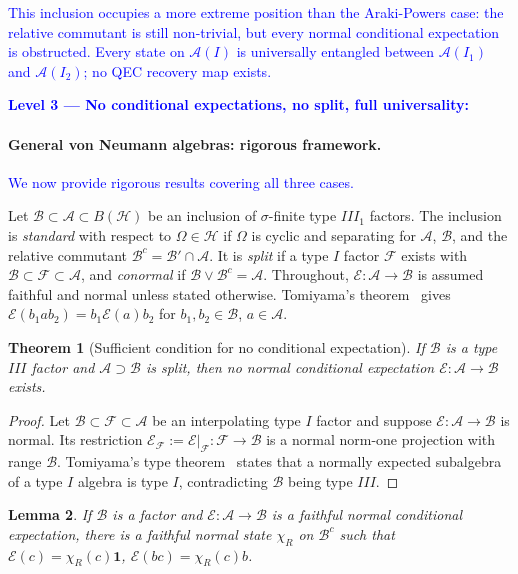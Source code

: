 \documentclass[a4paper,11pt]{article}
\newtheorem{theorem}{Theorem}
\newtheorem{lemma}[theorem]{Lemma}
\theoremstyle{definition}
\theoremstyle{remark}
\newcommand{\mA}{\mathcal{A}}
\newcommand{\mB}{\mathcal{B}}
\newcommand{\mE}{\mathcal{E}}
\begin{document}
\textcolor{blue}{This inclusion occupies a more extreme position than the Araki-Powers case: the
relative commutant is still non-trivial, but every normal conditional expectation is
obstructed.  Every state on $\mathcal{A}(I)$ is universally entangled between
$\mathcal{A}(I_1)$ and $\mathcal{A}(I_2)$; no QEC recovery map exists.}
 
\textcolor{blue}{\medskip
\noindent\textbf{Level 3 — No conditional expectations, no split, full universality:}}
 
\paragraph{General von Neumann algebras: rigorous framework.}%
\label{sec:conormality-expectations}
\textcolor{blue}{We now provide rigorous results covering all three cases.}
 
Let $\mB\subset\mA\subset B(\mathcal{H})$ be an inclusion of $\sigma$-finite type
$III_1$ factors.  The inclusion is \emph{standard} with respect to $\Omega\in\mathcal{H}$
if $\Omega$ is cyclic and separating for $\mA$, $\mB$, and the relative commutant
$\mB^c=\mB'\cap\mA$.  It is \emph{split} if a type $I$ factor $\mathcal{F}$ exists with
$\mB\subset\mathcal{F}\subset\mA$, and \emph{conormal} if $\mB\vee\mB^c=\mA$.
Throughout, $\mE:\mA\to\mB$ is assumed faithful and normal unless stated otherwise.
Tomiyama's theorem~\cite{Tomiyama1957,Tomiyama1959,Takesaki1972} gives
$\mE(b_1ab_2)=b_1\mE(a)b_2$ for $b_1,b_2\in\mB$, $a\in\mA$.
 
\begin{theorem}[Sufficient condition for no conditional expectation]%
\label{thm:split-no-expectation}
If $\mB$ is a type $III$ factor and $\mA\supset\mB$ is split, then no normal
conditional expectation $\mE:\mA\to\mB$ exists.
\end{theorem}
 
\begin{proof}
Let $\mB\subset\mathcal{F}\subset\mA$ be an interpolating type $I$ factor and suppose
$\mE:\mA\to\mB$ is normal.  Its restriction
$\mE_\mathcal{F}:=\mE|_\mathcal{F}:\mathcal{F}\to\mB$ is a normal norm-one projection
with range $\mB$.  Tomiyama's type theorem~\cite{Tomiyama1959,Takesaki1972} states
that a normally expected subalgebra of a type $I$ algebra is type $I$, contradicting
$\mB$ being type $III$.
\end{proof}
 
\begin{lemma}\label{lem:expectation-slice}
If $\mathcal{B}$ is a factor and $\mE:\mathcal{A}\to\mathcal{B}$ is a faithful normal
conditional expectation, there is a faithful normal state $\chi_R$ on $\mB^c$ such that
$\mE(c)=\chi_R(c)\mathbf{1}$, $\mE(bc)=\chi_R(c)b$.
\end{lemma}
 
\end{document}
